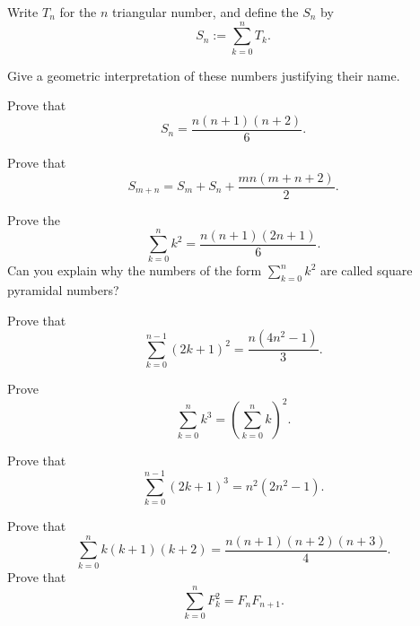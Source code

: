 \begin{routine}
\begin{subexenum}
  \end{subexenum}
  \exercise Write $T_n$ for the $n$\supth{} triangular number, and define the  $S_n$ by
  \begin{equation*}
    S_n:=\sum_{k=0}^nT_k.
  \end{equation*}
  \begin{subexenum}
  \item Give a geometric interpretation of these numbers justifying their name.
  \item Prove that
    \begin{equation*}
      S_n = \frac{n(n+1)(n+2)}{6}.
    \end{equation*}
  \item Prove that
    \begin{equation*}
      S_{m+n}=S_m+S_n+\frac{mn(m+n+2)}{2}.
    \end{equation*}
  \end{subexenum}
  \exercise
  \begin{subexenum}
  \item
    Prove the 
    \begin{equation*}
      \sum_{k=0}^n k^2 = \frac{n(n+1)(2n+1)}{6}.
    \end{equation*}
    Can you explain why the numbers of the form $\sum_{k=0}^n k^2$ are called square pyramidal numbers?
  \item Prove that
    \begin{equation*}
      \sum_{k=0}^{n-1}(2k+1)^2 = \frac{n(4n^2-1)}{3}.
    \end{equation*}
  \end{subexenum}
  \exercise
  \begin{subexenum}
  \item Prove 
    \begin{equation*}
      \sum_{k=0}^n k^3 = \left(\sum_{k=0}^{n}k\right)^2.
    \end{equation*}
  \item Prove that
    \begin{equation*}
      \sum_{k=0}^{n-1}(2k+1)^3=n^2(2n^2-1).
    \end{equation*}
  \end{subexenum}
  \exercise Prove that
  \begin{equation*}
    \sum_{k=0}^n k(k+1)(k+2) = \frac{n(n+1)(n+2)(n+3)}{4}.
  \end{equation*}
  \exercise Prove that
  \begin{equation*}
    \sum_{k=0}^n F_k^2 = F_nF_{n+1}.
  \end{equation*}
\end{routine}

